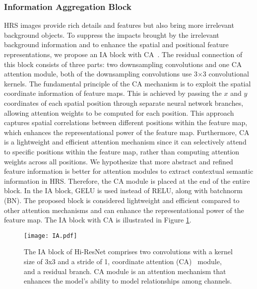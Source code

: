 \documentclass[journal]{IEEEtran}
\begin{document}
\subsubsection{Information Aggregation Block}
HRS images provide rich details and features but also bring more irrelevant background objects. To suppress the impacts brought by the irrelevant background information and to enhance the spatial and positional feature representations, we propose an IA block with CA~\cite{hou2021coordinate}. The residual connection of this block consists of three parts: two downsampling convolutions and one CA attention module, both of the downsampling convolutions use 3$\times$3 convolutional kernels. The fundamental principle of the CA mechanism is to exploit the spatial coordinate information of feature maps. This is achieved by passing the $x$ and $y$ coordinates of each spatial position through separate neural network branches, allowing attention weights to be computed for each position. This approach captures spatial correlations between different positions within the feature map, which enhances the representational power of the feature map. Furthermore, CA is a lightweight and efficient attention mechanism since it can selectively attend to specific positions within the feature map, rather than computing attention weights across all positions. We hypothesize that more abstract and refined feature information is better for attention modules to extract contextual semantic information in HRS. Therefore, the CA module is placed at the end of the entire block. In the IA block, GELU is used instead of RELU, along with batchnorm (BN). The proposed block is considered lightweight and efficient compared to other attention mechanisms and can enhance the representational power of the feature map. The IA block with CA is illustrated in Figure \ref{fig:IA}.

\begin{figure}[!ht]
    \centering
    \texttt{[image: IA.pdf]}
    \caption{The IA block of Hi-ResNet comprises two convolutions with a kernel size of 3x3 and a stride of 1, coordinate attention (CA)~\cite{hou2021coordinate} module, and a residual branch. CA module is an attention mechanism that enhances the model's ability to model relationships among channels.}  
    \label{fig:IA}
\end{figure}
\end{document}
